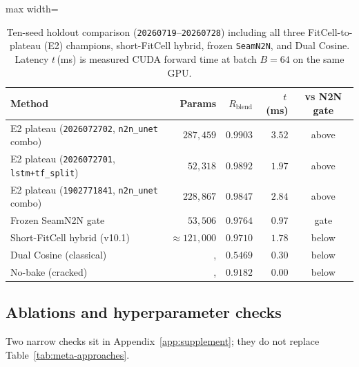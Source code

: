\begin{table}[t]
  \centering
  \caption{Ten-seed holdout comparison (\texttt{20260719}--\texttt{20260728}) including all three FitCell-to-plateau (E2) champions, short-FitCell hybrid, frozen \texttt{SeamN2N}, and Dual Cosine.
  Latency $t$\,(ms) is measured CUDA forward time at batch $B{=}64$ on the same GPU.}
  \label{tab:v14-hybrid-converge}
  \setlength{\tabcolsep}{3pt}
  \footnotesize
  \begin{adjustbox}{max width=\columnwidth}
  \begin{tabular}{@{}lrrrc@{}}
    \toprule
    Method & Params & $R_{\mathrm{blend}}$ & $t$\,(ms) & vs N2N gate \\
    \midrule
    E2 plateau (\texttt{2026072702}, \texttt{n2n\_unet} combo) & $287{,}459$ & $0.9903$ & $3.52$ & above \\
    E2 plateau (\texttt{2026072701}, \texttt{lstm+tf\_split}) & $52{,}318$ & $0.9892$ & $1.97$ & above \\
    E2 plateau (\texttt{1902771841}, \texttt{n2n\_unet} combo) & $228{,}867$ & $0.9847$ & $2.84$ & above \\
    Frozen SeamN2N gate & $53{,}506$ & $0.9764$ & $0.97$ & gate \\
    Short-FitCell hybrid (v10.1) & ${\approx}121{,}000$ & $0.9710$ & $1.78$ & below \\
    Dual Cosine (classical) &, & $0.5469$ & $0.30$ & below \\
    No-bake (cracked) &, & $0.9182$ & $0.00$ & below \\
    \bottomrule
  \end{tabular}
  \end{adjustbox}
\end{table}

\subsection{Ablations and hyperparameter checks}
\label{sec:ablation-def}
\label{sec:ablation-hp-main}

Two narrow checks sit in Appendix~\ref{app:supplement}; they do not replace Table~\ref{tab:meta-approaches}.

